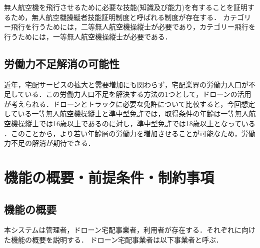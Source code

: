 \documentclass[a4paper, titlepage]{jsarticle}
\begin{document}
無人航空機を飛行させるために必要な技能(知識及び能力)を有することを証明するため，無人航空機操縦者技能証明制度と呼ばれる制度が存在する．
カテゴリー飛行を行うためには，二等無人航空機操縦士が必要であり，カテゴリー飛行を行うためには，一等無人航空機操縦士が必要である\cite{delivery_guidelines_2023}．

\subsection{労働力不足解消の可能性}
近年，宅配サービスの拡大と需要増加にも関わらず，宅配業界の労働力人口が不足している．この労働力人口不足を解決する方法の1つとして，ドローンの活用が考えられる．ドローンとトラックに必要な免許について比較すると，今回想定している一等無人航空機操縦士と準中型免許では，取得条件の年齢は一等無人航空機操縦士では16歳以上であるのに対し，準中型免許では18歳以上となっている\cite{nipponkaiji_shikaku} \cite{truckingAssociation}．このことから，より若い年齢層の労働力を増加させることが可能なため，労働力不足の解消が期待できる．


\section{機能の概要・前提条件・制約事項}
\subsection{機能の概要}
本システムは管理者，ドローン宅配事業者，利用者が存在する．それぞれに向けた機能の概要を説明する．
ドローン宅配事業者は以下事業者と呼ぶ．
\end{document}
